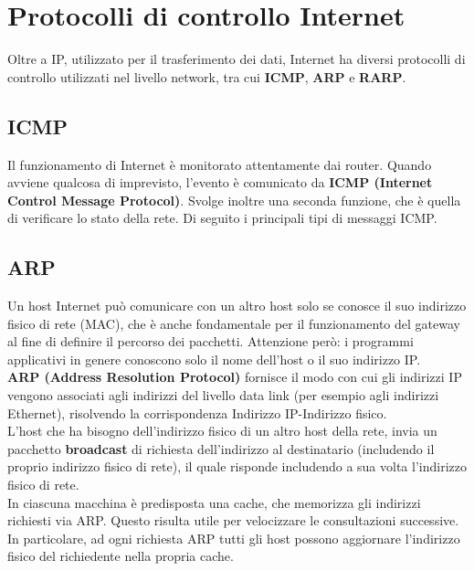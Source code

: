 \section{Protocolli di controllo Internet}
    Oltre a IP, utilizzato per il trasferimento dei dati, Internet ha diversi protocolli di controllo
    utilizzati nel livello network, tra cui \textbf{ICMP}, \textbf{ARP} e \textbf{RARP}.

        \subsection{ICMP}
        Il funzionamento di Internet è monitorato attentamente dai router. Quando avviene qualcosa
        di imprevisto, l’evento è comunicato da \textbf{ICMP (Internet Control Message Protocol)}. Svolge
        inoltre una seconda funzione, che è quella di verificare lo stato della rete. Di seguito i principali
        tipi di messaggi ICMP.


        \subsection{ARP}
        Un host Internet può comunicare con un altro host solo se conosce il suo indirizzo fisico di rete
        (MAC), che è anche fondamentale per il funzionamento del gateway al fine di definire il
        percorso dei pacchetti. Attenzione però: i programmi applicativi in genere conoscono solo il
        nome dell’host o il suo indirizzo IP.\\
        
        \textbf{ARP (Address Resolution Protocol)} fornisce il modo con cui gli indirizzi IP vengono associati
        agli indirizzi del livello data link (per esempio agli indirizzi Ethernet), risolvendo la
        corrispondenza Indirizzo IP-Indirizzo fisico.\\

        L’host che ha bisogno dell’indirizzo fisico di un altro host della rete, invia un pacchetto
        \textbf{broadcast} di richiesta dell’indirizzo al destinatario (includendo il proprio indirizzo fisico di
        rete), il quale risponde includendo a sua volta l’indirizzo fisico di rete.\\

        In ciascuna macchina è predisposta una cache, che memorizza gli indirizzi richiesti via ARP.
        Questo risulta utile per velocizzare le consultazioni successive. In particolare, ad ogni richiesta
        ARP tutti gli host possono aggiornare l’indirizzo fisico del richiedente nella propria cache.
        
